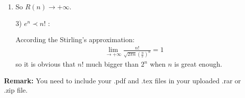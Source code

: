 \documentclass[12pt,a4paper]{article}
\makeatletter
\newtheorem*{solution}{Solution}
\theoremstyle{definition}
\renewenvironment{solution}[1][Solution] {\par\pushQED{\qed}\normalfont\topsep6\p@\@plus6\p@\relax\trivlist\item[\hskip\labelsep\bfseries#1\@addpunct{.}]\ignorespaces}{\popQED\endtrivlist\@endpefalse} \makeatother
\makeatother
\begin{document}
\begin{enumerate}
\begin{solution}
    \qquad So $R(n) \to +\infty$.
    
    3) \textbf{$e^n \prec n!$} :

        \qquad According the Stirling's approximation:
        \begin{align*}
            \lim_{\to +\infty} \frac{n!}{\sqrt{2\pi n}(\frac{n}{e})^n} = 1
        \end{align*}
        \qquad  so it is obvious that $n!$ much bigger than $2^n$ when $n$ is great enough.
    






        
    
        \end{solution}


\end{enumerate}

\vspace{20pt}

\textbf{Remark:} You need to include your .pdf and .tex files in your uploaded .rar or .zip file.

\end{document}
